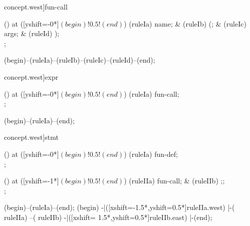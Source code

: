 \begin{syntax}[[xshift=20mm]concept.west]{fun-call}
  
  \node[sequence,column sep=1.5cm] () at ([yshift=-0*\syntaxruledist]$(begin)!0.5!(end)$) {
    \node[terminal]    (ruleIa) {name};
    &
    \node[terminal]    (ruleIb) {(};
    &
    \node[nonterminal] (ruleIc) {args};
    &
    \node[terminal]    (ruleId) {)};
    \\
  };
  
  \draw[path] (begin)--(ruleIa)--(ruleIb)--(ruleIc)--(ruleId)--(end);
\end{syntax}

\begin{syntax}[[xshift=20mm]concept.west]{expr}
  
  \node[sequence,column sep=1.5cm] () at ([yshift=-0*\syntaxruledist]$(begin)!0.5!(end)$) {
    \node[nonterminal] (ruleIa) {fun-call};
    \\
  };
  
  \draw[path] (begin)--(ruleIa)--(end);
\end{syntax}

\begin{syntax}[[xshift=20mm]concept.west]{stmt}
  
  \node[sequence,column sep=1.5cm] () at ([yshift=-0*\syntaxruledist]$(begin)!0.5!(end)$) {
    \node[nonterminal] (ruleIa) {fun-def};
    \\
  };
  
  \node[sequence,column sep=1.5cm] () at ([yshift=-1*\syntaxruledist]$(begin)!0.5!(end)$) {
    \node[nonterminal] (ruleIIa) {fun-call};
    &
    \node[terminal]    (ruleIIb) {;};
    \\
  };
  
  \draw[path] (begin)--(ruleIa)--(end);
  \draw[path] (begin)
            -|([xshift=-1.5*\syntaxruledist,yshift=0.5*\syntaxruledist]ruleIIa.west)
            |-(                                                         ruleIIa)
            --(                                                         ruleIIb)
            -|([xshift= 1.5*\syntaxruledist,yshift=0.5*\syntaxruledist]ruleIIb.east)
            |-(end);
\end{syntax}

